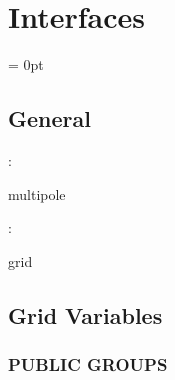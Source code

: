 \documentclass{article}
\begin{document}
\section{Interfaces} 


\parskip = 0pt

\vspace{3mm} \subsection*{General}

: 

multipole
\vspace{2mm}

: 

grid
\vspace{2mm}
\subsection*{Grid Variables}
\vspace{5mm}\subsubsection{PUBLIC GROUPS}

\vspace{5mm}
\end{document}
